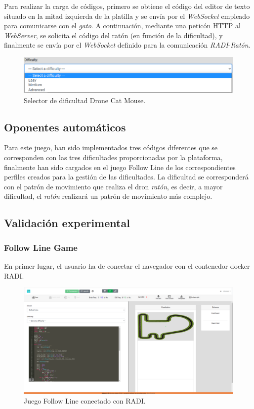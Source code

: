 \documentclass[a4paper, 12pt]{book}
\begin{document}
Para realizar la carga de códigos, primero se obtiene el código del editor de texto situado en la mitad izquierda de la platilla y se envía por el \emph{WebSocket} empleado para comunicarse con el \emph{gato}. A continuación, mediante una peticón HTTP al \emph{WebServer}, se solicita el código del ratón (en función de la dificultad), y finalmente se envía por el \emph{WebSocket} definido para la comunicación  \emph{RADI}-\emph{Ratón}.

\begin{figure}[H]
	\centering
    \includegraphics[width=15cm]{img/drone_cat_mouse_difficulty.png}
    \caption{Selector de dificultad Drone Cat Mouse.}
    \label{figura:evaluator_drone}
\end{figure}

\subsection{Oponentes automáticos}

Para este juego, han sido implementados tres códigos diferentes que se corresponden con las tres dificultades proporcionadas por la plataforma, finalmente han sido cargados en el juego Follow Line de los correspondientes perfiles creados para la gestión de las dificultades. La dificultad se corresponderá con el patrón de movimiento que realiza el dron \emph{ratón}, es decir, a mayor dificultad, el \emph{ratón} realizará un patrón de movimiento más complejo.

\subsection{Validación experimental}

\subsubsection{Follow Line Game}

En primer lugar, el usuario ha de conectar el navegador con el contenedor docker RADI.

\begin{figure}[H]
	\centering
    \includegraphics[width=15cm]{img/fl_radi_connected.png}
    \caption{Juego Follow Line conectado con RADI.}
    \label{figura:evaluator_drone}
\end{figure}
\end{document}
